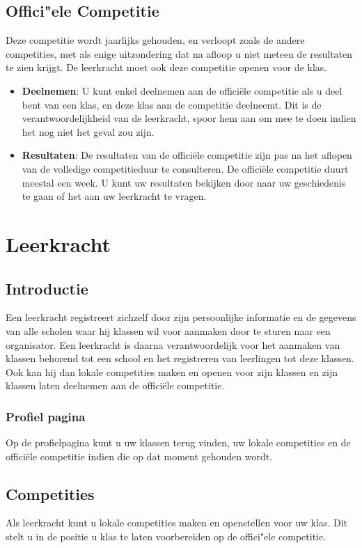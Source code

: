 \documentclass[11pt,a4paper]{report}
\begin{document}
\section{Offici"ele Competitie}
Deze competitie wordt jaarlijks gehouden, en verloopt zoals de andere competities, met als enige uitzondering dat na afloop u niet meteen de resultaten te zien krijgt. De leerkracht moet ook deze competitie openen voor de klas.
\begin{itemize}
  \item \textbf{Deelnemen}: U kunt enkel deelnemen aan de offici\"ele competitie als u deel bent van een klas, en deze klas aan de competitie deelneemt. Dit is de verantwoordelijkheid van de leerkracht, spoor hem aan om mee te doen indien het nog niet het geval zou zijn.
	\item \textbf{Resultaten}:  De resultaten van de offici\"ele competitie zijn pas na het aflopen van de volledige competitieduur te consulteren. De offici\"ele competitie duurt meestal een week. U kunt uw resultaten bekijken door naar uw geschiedenis te gaan of het aan uw leerkracht te vragen.
\end{itemize}


\chapter{Leerkracht}

\section{Introductie}
Een leerkracht registreert zichzelf door zijn persoonlijke informatie en de gegevens van alle scholen waar hij klassen wil voor aanmaken door te sturen naar een organisator. Een leerkracht is daarna verantwoordelijk voor het aanmaken van klassen behorend tot een school en het registreren van leerlingen tot deze klassen. Ook kan hij dan lokale competities maken en openen voor zijn klassen en zijn klassen laten deelnemen aan de offici\"ele competitie. 
\subsection{Profiel pagina}
Op de profielpagina kunt u uw klassen terug vinden, uw lokale competities en de offici\"ele competitie indien die op dat moment gehouden wordt.
\section{Competities}
Als leerkracht kunt u lokale competities maken en openstellen voor uw klas. Dit stelt u in de positie u klas te laten voorbereiden op de offici"ele competitie. 
\end{document}
